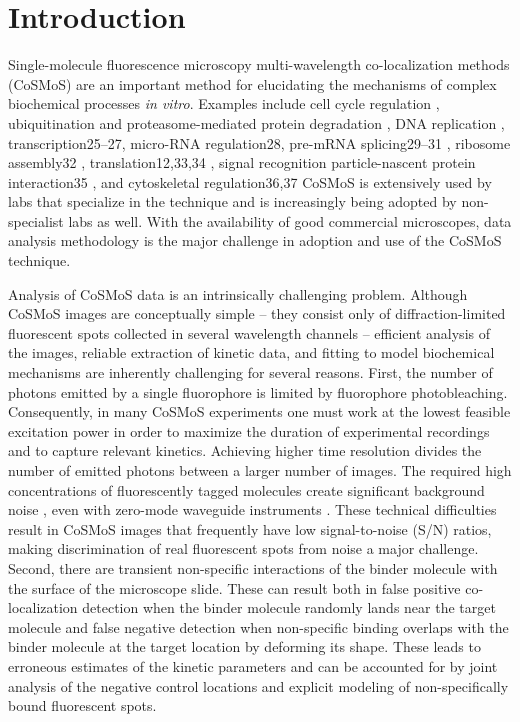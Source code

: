 \section{Introduction}

Single-molecule fluorescence microscopy multi-wavelength co-localization methods (CoSMoS) are an important method for elucidating the mechanisms of complex biochemical processes \textit{in vitro}. Examples include cell cycle regulation \citep{Lu2015-eu}, ubiquitination and proteasome-mediated protein degradation \citep{Lu2015-jq}, DNA replication \citep{Geertsema2014-bt}, transcription25–27, micro-RNA regulation28, pre-mRNA splicing29–31
, ribosome assembly32 , translation12,33,34
, signal recognition particle-nascent protein
interaction35
, and cytoskeletal regulation36,37 CoSMoS is extensively used by labs that specialize in the technique and is increasingly being adopted by non-specialist labs as well. With the availability of good commercial microscopes, data analysis methodology is the major challenge in adoption and use of the CoSMoS technique.

Analysis of CoSMoS data is an intrinsically challenging problem. Although CoSMoS images are conceptually simple -- they consist only of diffraction-limited fluorescent spots collected in several wavelength channels -- efficient analysis of the images, reliable extraction of kinetic data, and fitting to model biochemical mechanisms are inherently challenging for several reasons. First, the number of photons emitted by a single fluorophore is limited by fluorophore photobleaching. Consequently, in many CoSMoS experiments one must work at the lowest feasible excitation power in order to maximize the duration of experimental recordings and to capture relevant kinetics. Achieving higher time resolution divides the number of emitted photons between a larger number of images. The required high concentrations of fluorescently tagged molecules create significant background noise \citep{Peng2018-ge, Van_Oijen2011-ig}, even with zero-mode waveguide instruments \citep{Chen2014-jd}. These technical difficulties result in CoSMoS images that frequently have low signal-to-noise (S/N) ratios, making discrimination of real fluorescent spots from noise a major challenge. Second, there are transient non-specific interactions of the binder molecule with the surface of the microscope slide. These can result both in false positive co-localization detection when the binder molecule randomly lands near the target molecule and false negative detection when non-specific binding overlaps with the binder molecule at the target location by deforming its shape. These leads to erroneous estimates of the kinetic parameters and can be accounted for by joint analysis of the negative control locations and explicit modeling of non-specifically bound fluorescent spots.

